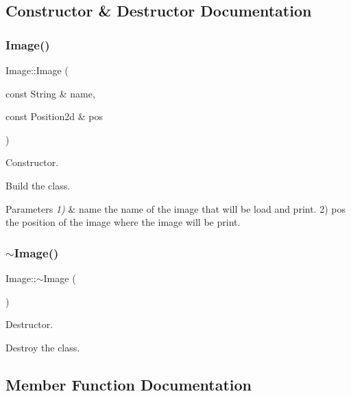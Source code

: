 \subsection{Constructor \& Destructor Documentation}
\mbox{\label{classImage_aca308a45e7c53ec95e244863cb31a738}} 
\subsubsection{\texorpdfstring{Image()}{Image()}}
{\footnotesize\ttfamily Image\+::\+Image (\begin{DoxyParamCaption}\item[{const String \&}]{name,  }\item[{const Position2d \&}]{pos }\end{DoxyParamCaption})}



Constructor. 

Build the class.


\begin{DoxyParams}{Parameters}
{\em 1)} & \textquotesingle{}name\textquotesingle{} the name of the image that will be load and print. 2) \textquotesingle{}pos\textquotesingle{} the position of the image where the image will be print. \\
\hline
\end{DoxyParams}
\mbox{\label{classImage_a0294f63700543e11c0f0da85601c7ae5}} 
\subsubsection{\texorpdfstring{$\sim$\+Image()}{~Image()}}
{\footnotesize\ttfamily Image\+::$\sim$\+Image (\begin{DoxyParamCaption}{ }\end{DoxyParamCaption})}



Destructor. 

Destroy the class. 

\subsection{Member Function Documentation}
\mbox{\label{classImage_aca043fb78326d6ce135498419e2d1833}} 
